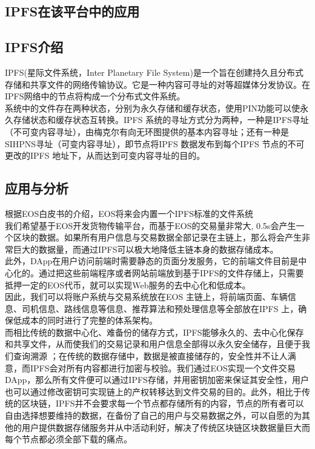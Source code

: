 \documentclass[UTF8]{ctexart}
\begin{document}
\begin{multicols}{2}
\section{IPFS在该平台中的应用}
\subsection{IPFS介绍}
IPFS(星际文件系统，Inter Planetary File System)是一个旨在创建持久且分布式存储和共享文件的网络传输协议。它是一种内容可寻址的对等超媒体分发协议。在IPFS网络中的节点将构成一个分布式文件系统。\\
 系统中的文件存在两种状态，分别为永久存储和缓存状态，使用PIN功能可以使永久存储状态和缓存状态互转换。IPFS 系统的寻址方式分为两种，一种是IPFS寻址（不可变内容寻址），由梅克尔有向无环图提供的基本内容寻址；还有一种是SIHPNS寻址（可变内容寻址），即节点将IPFS 数据发布到每个IPFS 节点的不可更改的IPFS 地址下，从而达到可变内容寻址的目的。
\subsection{应用与分析}
根据EOS白皮书的介绍，EOS将来会内置一个IPFS标准的文件系统\cite{ref5}\\
\indent 我们希望基于EOS开发货物传输平台，而基于EOS的交易量非常大, 0.5s会产生一个区块的数据。如果所有用户信息与交易数据全部记录在主链上，那么将会产生非常巨大的数据量，而通过IPFS可以极大地降低主链本身的数据存储成本。\\
\indent 此外，DApp在用户访问前端时需要静态的页面分发服务，它的前端文件目前是中心化的。通过把这些前端程序或者网站前端放到基于IPFS的文件存储上，只需要抵押一定的EOS代币，就可以实现Web服务的去中心化和低成本。\\
因此，我们可以将账户系统与交易系统放在EOS 主链上，将前端页面、车辆信息、司机信息、路线信息等信息、推荐算法和预处理信息等全部放在IPFS 上，确保低成本的同时进行了完整的体系架构。\\
\indent 而相比传统的数据中心化、难备份的储存方式，IPFS能够永久的、去中心化保存和共享文件，从而使我们的交易记录和用户信息全部得以永久安全储存，且便于我们查询溯源 ；在传统的数据存储中，数据是被直接储存的，安全性并不让人满意，而IPFS会对所有内容都进行加密与校验。我们通过EOS实现一个文件交易DApp，那么所有文件便可以通过IPFS存储，并用密钥加密来保证其安全性，用户也可以通过修改密钥可实现链上的产权转移达到文件交易的目的。此外，相比于传统的区块链，IPFS并不会要求每一个节点都存储所有的内容，节点的所有者可以自由选择想要维持的数据，在备份了自己的用户与交易数据之外，可以自愿的为其他的用户提供数据存储服务并从中活动利好，解决了传统区块链区块数据量巨大而每个节点都必须全部下载的痛点。

\end{multicols}
\end{document}
